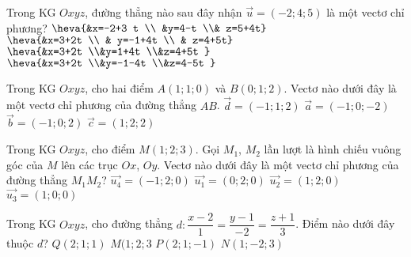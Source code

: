 \begin{ex}%
	Trong KG $Oxyz$, đường thẳng nào sau đây nhận $\overrightarrow{u}=(-2;4;5)$ là một vectơ chỉ phương?
	\choice
	{$\heva{&x=-2+3 t \\ &y=4-t \\& z=5+4t}$}
	{$\heva{&x=3+2t \\ & y=-1+4t \\ & z=4+5t}$}
	{$\heva{&x=3+2t  \\&y=1+4t  \\&z=4+5t }$}
	{\True $\heva{&x=3+2t  \\&y=-1-4t  \\&z=4-5t }$}
\end{ex}
\begin{ex}%
	Trong KG $Oxyz$, cho hai điểm $A(1;1;0)$ và $B( 0;1;2 )$. Vectơ nào dưới đây là một vectơ chỉ phương của đường thẳng $AB$.
	\choice
	{ $\overrightarrow{d}=(-1;1;2)$}
	{ $\overrightarrow{a}=(-1;0;-2)$}
	{\True $\overrightarrow{b}=(-1;0;2)$}
	{ $\overrightarrow{c}=( 1;2;2)$}
\end{ex}
\begin{ex}%
	Trong KG $Oxyz$, cho điểm $M( 1;2;3 )$. Gọi ${M}_{1}$, ${M}_{2}$ lần lượt là hình chiếu vuông góc của $M$ lên các trục $Ox$, $Oy$. Vectơ nào dưới đây là một vectơ chỉ phương của đường thẳng $M_1M_2$?
	\choice
	{ \True $\overrightarrow{{{u}_{4}}}=( -1;2;0 )$}
	{ $\overrightarrow{{u}_{1}}=( 0;2;0)$}
	{  $\overrightarrow {u_2}=( 1;2;0 )$}
	{ $\overrightarrow{{{u}_{3}}}=( 1;0;0 )$}
\end{ex}
\begin{ex}%
	Trong KG $Oxyz$, cho đường thẳng $d \colon\dfrac{x-2}{1}=\dfrac{y-1}{-2}=\dfrac{z+1}{3}$. Điểm nào dưới đây thuộc $d$?
	\choice
	{ $Q( 2;1;1 )$}
	{ $M( 1;2;3 $}
	{ \True $P( 2;1;-1)$}
	{ $N( 1;-2;3) $}
\end{ex}
